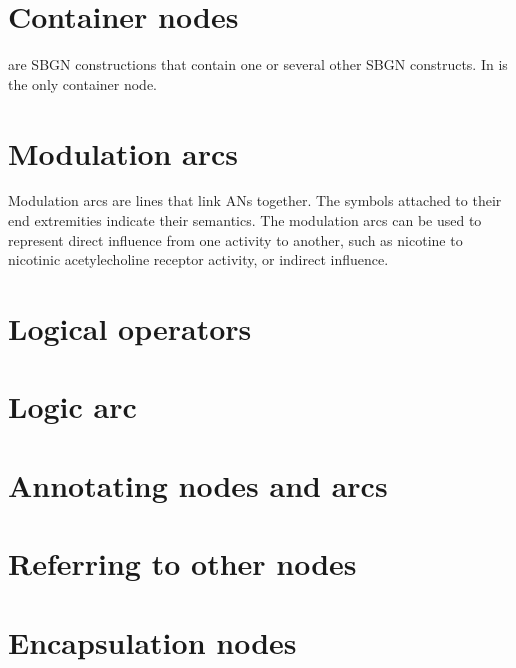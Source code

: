 



\section{Container nodes}
\label{sec:af:CNs}

 are SBGN constructions that contain one or several other SBGN constructs.  In \SBGNAFLone {} is the only container node.




\section{Modulation arcs}\label{sec:af:arcs}

Modulation arcs are lines that link ANs together.  The symbols attached to their end extremities indicate their semantics.  The modulation arcs can be used to represent direct influence from one activity to another, such as nicotine to nicotinic acetylecholine receptor activity, or indirect influence.









\section{Logical operators}\label{sec:af:logic}




 

\section{Logic arc}
\label{sec:logic_arc}


\section{Annotating nodes and arcs}


\section{Referring to other nodes}
\label{sec:ref_nodes}






\section{Encapsulation nodes}


